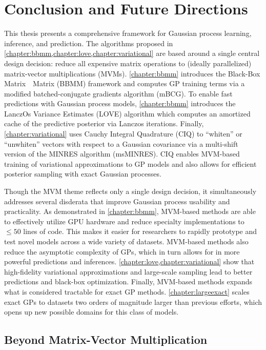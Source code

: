 \chapter{Conclusion and Future Directions}
\label{chapter:discussion}


This thesis presents a comprehensive framework for Gaussian process learning, inference, and prediction.
The algorithms proposed in \cref{chapter:bbmm,chapter:love,chapter:variational} are based around a single central design decision: reduce all expensive matrix operations to (ideally parallelized) matrix-vector multiplications (MVMs).
\cref{chapter:bbmm} introduces the Black-Box Matrix~\texttimes~Matrix (BBMM) framework and computes GP training terms via a modified batched-conjugate gradients algorithm (mBCG).
To enable fast predictions with Gaussian process models, \cref{chapter:bbmm} introduces the LanczOs Variance Estimates (LOVE) algorithm which computes an amortized cache of the predictive posterior via Lanczos iterations.
Finally, \cref{chapter:variational} uses Cauchy Integral Quadrature (CIQ) to ``whiten'' or ``unwhiten'' vectors with respect to a Gaussian covariance via a multi-shift version of the MINRES algorithm (msMINRES).
CIQ enables MVM-based training of variational approximations to GP models and also allows for efficient posterior sampling with exact Gaussian processes.

Though the MVM theme reflects only a single design decision, it simultaneously addresses several disderata that improve Gaussian process usability and practicality.
As demonstrated in \cref{chapter:bbmm}, MVM-based methods are able to effectively utilize GPU hardware and reduce specialty implementations to $\leq 50$ lines of code.
This makes it easier for researchers to rapidly prototype and test novel models across a wide variety of datasets.
MVM-based methods also reduce the asymptotic complexity of GPs, which in turn allows for in more powerful predictions and inferences.
\cref{chapter:love,chapter:variational} show that high-fidelity variational approximations and large-scale sampling lead to better predictions and black-box optimization.
Finally, MVM-based methods expands what is considered tractable for exact GP methods.
\cref{chapter:largeexact} scales exact GPs to datasets two orders of magnitude larger than previous efforts, which opens up new possible domains for this class of models.



\section{Beyond Matrix-Vector Multiplication}

